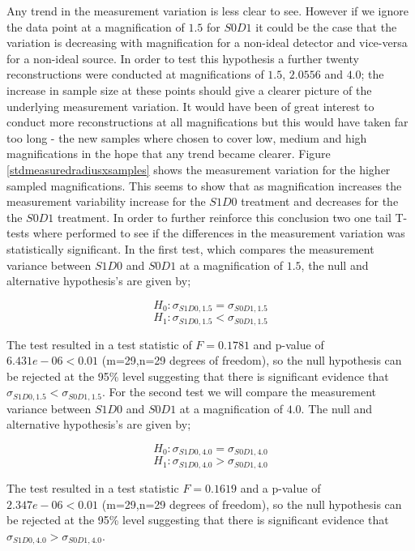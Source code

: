 \documentclass[
  twoside,
  11pt, a4paper,
  footinclude=true,
  headinclude=true,
  cleardoublepage=empty
]{scrbook}
\begin{document}
Any trend in the measurement variation is less clear to see. However if we ignore the data point at a magnification of $1.5$ for $S0D1$ it could be the case that the variation is decreasing with magnification for a non-ideal detector and vice-versa for a non-ideal source. In order to test this hypothesis a further twenty reconstructions were conducted at magnifications of $1.5$, $2.0556$ and $4.0$; the increase in sample size at these points should give a clearer picture of the underlying measurement variation. It would have been of great interest to conduct more reconstructions at all magnifications but this would have taken far too long - the new samples where chosen to cover low, medium and high magnifications in the hope that any trend became clearer. Figure \ref{stdmeasuredradiusxsamples} shows the measurement variation for the higher sampled magnifications. This seems to show that as magnification increases the measurement variability increase for the $S1D0$ treatment and decreases for the the $S0D1$ treatment. In order to further reinforce this conclusion two one tail T-tests where performed to see if the differences in the measurement variation was statistically significant. In the first test, which compares the measurement variance between $S1D0$ and  $S0D1$ at a magnification of $1.5$, the null and alternative hypothesis's are given by;

\[
H_0: \sigma_{S1D0,1.5} = \sigma_{S0D1,1.5}
\]
\[
H_1: \sigma_{S1D0,1.5} < \sigma_{S0D1,1.5}
\]

The test resulted in a test statistic of $F=0.1781$ and p-value of $6.431e-06 < 0.01$ (m=29,n=29 degrees of freedom), so the null hypothesis can be rejected at the 95\% level suggesting that there is significant evidence that $\sigma_{S1D0,1.5} < \sigma_{S0D1,1.5}$. For the second test we will compare the measurement variance between $S1D0$ and  $S0D1$ at a magnification of $4.0$. The null and alternative hypothesis's are given by;

\[
H_0: \sigma_{S1D0,4.0} = \sigma_{S0D1,4.0}
\]
\[
H_1: \sigma_{S1D0,4.0} > \sigma_{S0D1,4.0}
\]

The test resulted in a test statistic $F = 0.1619$ and a p-value of $2.347e-06 < 0.01$ (m=29,n=29 degrees of freedom), so the null hypothesis can be rejected at the 95\% level suggesting that there is significant evidence that $\sigma_{S1D0,4.0} > \sigma_{S0D1,4.0}$.
\end{document}
